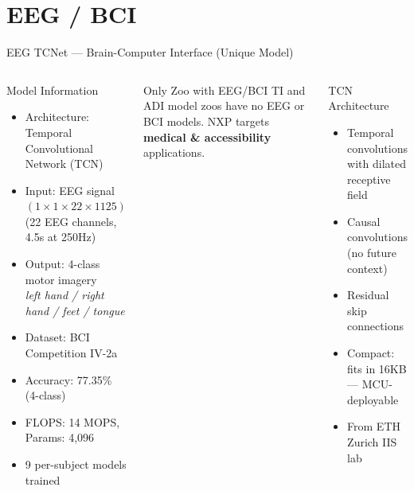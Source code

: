 \documentclass[aspectratio=169]{beamer}
\begin{document}
\section{EEG / BCI}

\begin{frame}{EEG TCNet — Brain-Computer Interface (Unique Model)}
  \begin{columns}[T]
      \begin{block}{Model Information}
        \begin{itemize}\small
          \item Architecture: Temporal Convolutional Network (TCN)
          \item Input: EEG signal $(1 \times 1 \times 22 \times 1125)$\\\scriptsize(22 EEG channels, 4.5s at 250Hz)
          \item Output: 4-class motor imagery\\
            \scriptsize\textit{left hand / right hand / feet / tongue}
          \item Dataset: BCI Competition IV-2a
          \item Accuracy: \alert{77.35\%} (4-class)
          \item FLOPS: \alert{14 MOPS}, Params: \alert{4,096}
          \item 9 per-subject models trained
        \end{itemize}
      \end{block}
      \vspace{4pt}
      \begin{alertblock}{Only Zoo with EEG/BCI}
        TI and ADI model zoos have no EEG or BCI models. NXP targets \textbf{medical \& accessibility} applications.
      \end{alertblock}
      \begin{block}{TCN Architecture}
        \begin{itemize}\scriptsize
          \item Temporal convolutions with dilated receptive field
          \item Causal convolutions (no future context)
          \item Residual skip connections
          \item Compact: fits in 16KB — MCU-deployable
          \item From ETH Zurich IIS lab
        \end{itemize}

\end{block}
\end{columns}
\end{frame}
\end{document}
